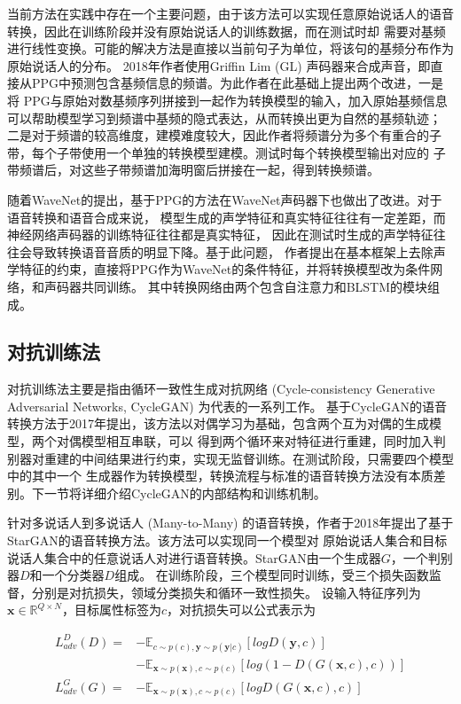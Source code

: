 当前方法在实践中存在一个主要问题，由于该方法可以实现任意原始说话人的语音转换，因此在训练阶段并没有原始说话人的训练数据，而在测试时却
需要对基频进行线性变换。可能的解决方法是直接以当前句子为单位，将该句的基频分布作为原始说话人的分布。
2018年作者使用Griffin Lim (GL) 声码器来合成声音，即直接从PPG中预测包含基频信息的频谱。为此作者在此基础上提出两个改进，一是将
PPG与原始对数基频序列拼接到一起作为转换模型的输入，加入原始基频信息可以帮助模型学习到频谱中基频的隐式表达，从而转换出更为自然的基频轨迹；
二是对于频谱的较高维度，建模难度较大，因此作者将频谱分为多个有重合的子带，每个子带使用一个单独的转换模型建模。测试时每个转换模型输出对应的
子带频谱后，对这些子带频谱加海明窗后拼接在一起，得到转换频谱。

随着WaveNet的提出，基于PPG的方法在WaveNet声码器下也做出了改进。对于语音转换和语音合成来说，
模型生成的声学特征和真实特征往往有一定差距，而神经网络声码器的训练特征往往都是真实特征，
因此在测试时生成的声学特征往往会导致转换语音音质的明显下降。基于此问题，
作者提出在基本框架上去除声学特征的约束，直接将PPG作为WaveNet的条件特征，并将转换模型改为条件网络，和声码器共同训练。
其中转换网络由两个包含自注意力和BLSTM的模块组成。




\subsection{对抗训练法}
对抗训练法主要是指由循环一致性生成对抗网络 (Cycle-consistency Generative Adversarial Networks, CycleGAN) 为代表的一系列工作。
基于CycleGAN的语音转换方法于2017年提出，该方法以对偶学习为基础，包含两个互为对偶的生成模型，两个对偶模型相互串联，可以
得到两个循环来对特征进行重建，同时加入判别器对重建的中间结果进行约束，实现无监督训练。在测试阶段，只需要四个模型中的其中一个
生成器作为转换模型，转换流程与标准的语音转换方法没有本质差别。下一节将详细介绍CycleGAN的内部结构和训练机制。

针对多说话人到多说话人 (Many-to-Many) 的语音转换，作者于2018年提出了基于StarGAN的语音转换方法。该方法可以实现同一个模型对
原始说话人集合和目标说话人集合中的任意说话人对进行语音转换。StarGAN由一个生成器$G$，一个判别器$D$和一个分类器$D$组成。
在训练阶段，三个模型同时训练，受三个损失函数监督，分别是对抗损失，领域分类损失和循环一致性损失。
设输入特征序列为$\mathbf{x}\in \mathbb{R}^{Q\times N}$，目标属性标签为$c$，对抗损失可以公式表示为

\begin{align}
    L^D_{adv}(D) = & -\mathbb{E}_{c\sim p(c),\mathbf{y}\sim p(\mathbf{y}|c)}\left[ log D(\mathbf{y}, c) \right] \\
                   & -\mathbb{E}_{\mathbf{x}\sim p(\mathbf{x}),c\sim p(c)}\left[ log(1-D(G(\mathbf{x},c),c)) \right] \\
    L^G_{adv}(G) = & -\mathbb{E}_{\mathbf{x}\sim p(\mathbf{x}),c\sim p(c)}\left[ log D(G(\mathbf{x},c),c) \right]
\end{align}

